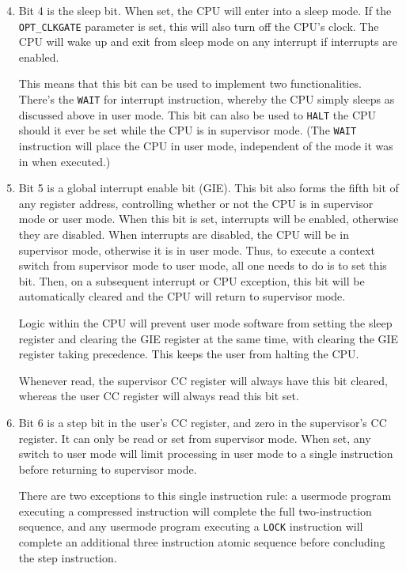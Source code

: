 \documentclass{gqtekspec}
\begin{document}
\begin{enumerate}
	\setcounter{enumi}{3}
\item Bit 4 is the sleep bit.  When set, the CPU will enter into a sleep mode.
	If the {\tt OPT\_CLKGATE} parameter is set, this will also turn off the
	CPU's clock.  The CPU will wake up and exit from sleep mode on any
	interrupt if interrupts are enabled.

	This means that this bit can be used to implement two functionalities.
	There's the {\tt WAIT} for interrupt instruction, whereby the CPU
	simply sleeps as discussed above in user mode.  This bit can also be
	used to {\tt HALT} the CPU should it ever be set while the CPU is in
	supervisor mode.  (The {\tt WAIT} instruction will place the CPU in
	user mode, independent of the mode it was in when executed.)

\item Bit 5 is a global interrupt enable bit (GIE).  This bit also
	forms the fifth bit of any register address, controlling whether or not
	the CPU is in supervisor mode or user mode.  When this bit is set,
	interrupts will be enabled, otherwise they are disabled.  When 
	interrupts are disabled, the CPU will be in supervisor mode, otherwise
	it is in user mode.  Thus, to execute a context switch from supervisor
	mode to user mode, all one needs to do is to set this bit.  Then, on
	a subsequent interrupt or CPU exception, this bit will be automatically
	cleared and the CPU will return to supervisor mode.

	Logic within the CPU will prevent user mode software from setting
	the sleep register and clearing the GIE register at the same time,
	with clearing the GIE register taking precedence.  This keeps the
	user from halting the CPU.

	Whenever read, the supervisor CC register will always have this bit
	cleared, whereas the user CC register will always read this bit set.

\item Bit 6 is a step bit in the user's CC register, and zero in the
	supervisor's CC register.  It can only be read or set from supervisor
	mode.  When set, any switch to user mode will limit processing in user
	mode to a single instruction before returning to supervisor mode.

	There are two exceptions to this single instruction rule: a usermode
	program executing a compressed instruction will complete the full
	two-instruction sequence, and any usermode program executing a
	{\tt LOCK} instruction will complete an additional three instruction
	atomic sequence before concluding the step instruction.


\end{enumerate}
\end{document}
